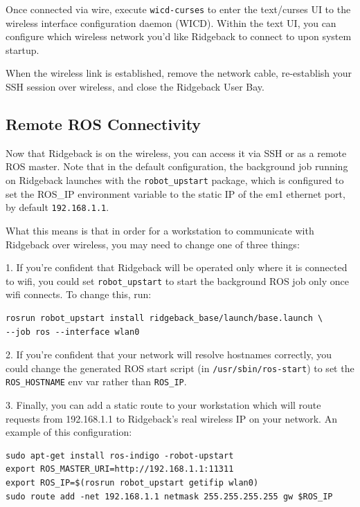 \documentclass[]{clearpath-latex/clearpath-manual}
\begin{document}
Once connected via wire, execute \lstinline{wicd-curses} to enter the text/curses UI to the wireless interface configuration daemon (WICD). Within the text UI, you can configure which wireless network you’d like Ridgeback to connect to upon system startup.

When the wireless link is established, remove the network cable, re-establish your SSH session over wireless,
and close the Ridgeback User Bay.

\subsection{Remote ROS Connectivity}

Now that Ridgeback is on the wireless, you can access it via SSH or as a remote ROS master. Note that in
the default configuration, the background job running on Ridgeback launches with the \lstinline{robot_upstart} package,
which is configured to set the ROS\_IP environment variable to the static IP of the em1 ethernet port, by default
\lstinline{192.168.1.1}.

What this means is that in order for a workstation to communicate with Ridgeback over wireless, you may need to
change one of three things:

1. If you’re confident that Ridgeback will be operated only where it is connected to wifi, you could set
\lstinline{robot_upstart} to start the background ROS job only once wifi connects. To change this, run:

\begin{lstlisting} 
rosrun robot_upstart install ridgeback_base/launch/base.launch \
--job ros --interface wlan0
\end{lstlisting}


2. If you’re confident that your network will resolve hostnames correctly, you could change the generated
ROS start script (in \lstinline{/usr/sbin/ros-start}) to set the \lstinline{ROS_HOSTNAME} env var rather than \lstinline{ROS_IP}.

3. Finally, you can add a static route to your workstation which will route requests from 192.168.1.1 to
Ridgeback's real wireless IP on your network. An example of this configuration:

\begin{lstlisting} 
sudo apt-get install ros-indigo -robot-upstart
export ROS_MASTER_URI=http://192.168.1.1:11311
export ROS_IP=$(rosrun robot_upstart getifip wlan0)
sudo route add -net 192.168.1.1 netmask 255.255.255.255 gw $ROS_IP
\end{lstlisting}
\end{document}
